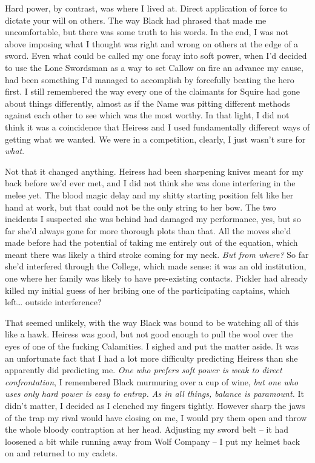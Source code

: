 \documentclass[12pt, openany]{book}
\begin{document}
Hard power, by contrast, was where I lived at. Direct application of force to dictate your will on others. The way Black had phrased that made me uncomfortable, but there was some truth to his words. In the end, I was not above imposing what I thought was right and wrong on others at the edge of a sword. Even what could be called my one foray into soft power, when I’d decided to use the Lone Swordsman as a way to set Callow on fire an advance my cause, had been something I’d managed to accomplish by forcefully beating the hero first. I still remembered the way every one of the claimants for Squire had gone about things differently, almost as if the Name was pitting different methods against each other to see which was the most worthy. In that light, I did not think it was a coincidence that Heiress and I used fundamentally different ways of getting what we wanted. We were in a competition, clearly, I just wasn’t sure for \textit{what}.

Not that it changed anything. Heiress had been sharpening knives meant for my back before we’d ever met, and I did not think she was done interfering in the melee yet. The blood magic delay and my shitty starting position felt like her hand at work, but that could not be the only string to her bow. The two incidents I suspected she was behind had damaged my performance, yes, but so far she’d always gone for more thorough plots than that. All the moves she’d made before had the potential of taking me entirely out of the equation, which meant there was likely a third stroke coming for my neck. \textit{But from where? }So far she’d interfered through the College, which made sense: it was an old institution, one where her family was likely to have pre-existing contacts. Pickler had already killed my initial guess of her bribing one of the participating captains, which left… outside interference?

That seemed unlikely, with the way Black was bound to be watching all of this like a hawk. Heiress was good, but not good enough to pull the wool over the eyes of one of the fucking Calamities. I sighed and put the matter aside. It was an unfortunate fact that I had a lot more difficulty predicting Heiress than she apparently did predicting me. \textit{One who prefers soft power is weak to direct confrontation}, I remembered Black murmuring over a cup of wine, \textit{but one who uses only hard power is easy to entrap. As in all things, balance is paramount.} It didn’t matter, I decided as I clenched my fingers tightly. However sharp the jaws of the trap my rival would have closing on me, I would pry them open and throw the whole bloody contraption at her head. Adjusting my sword belt – it had loosened a bit while running away from Wolf Company – I put my helmet back on and returned to my cadets.
\end{document}
